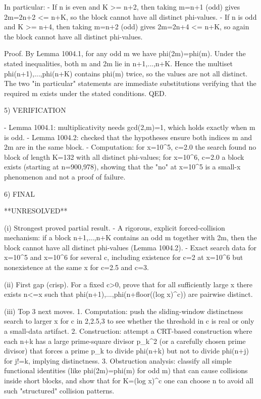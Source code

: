 In particular:
- If n is even and K >= n+2, then taking m=n+1 (odd) gives 2m=2n+2 <= n+K, so the block cannot have all distinct phi-values.
- If n is odd and K >= n+4, then taking m=n+2 (odd) gives 2m=2n+4 <= n+K, so again the block cannot have all distinct phi-values.

Proof.
By Lemma 1004.1, for any odd m we have phi(2m)=phi(m).
Under the stated inequalities, both m and 2m lie in {n+1,...,n+K}. Hence the multiset {phi(n+1),...,phi(n+K)} contains phi(m) twice, so the values are not all distinct.
The two "in particular" statements are immediate substitutions verifying that the required m exists under the stated conditions.  QED.

5) VERIFICATION

- Lemma 1004.1: multiplicativity needs gcd(2,m)=1, which holds exactly when m is odd.
- Lemma 1004.2: checked that the hypotheses ensure both indices m and 2m are in the same block.
- Computation: for x=10^5, c=2.0 the search found no block of length K=132 with all distinct phi-values; for x=10^6, c=2.0 a block exists (starting at n=900,978), showing that the "no" at x=10^5 is a small-x phenomenon and not a proof of failure.

6) FINAL

**UNRESOLVED**

(i) Strongest proved partial result.
- A rigorous, explicit forced-collision mechanism: if a block {n+1,...,n+K} contains an odd m together with 2m, then the block cannot have all distinct phi-values (Lemma 1004.2).
- Exact search data for x=10^5 and x=10^6 for several c, including existence for c=2 at x=10^6 but nonexistence at the same x for c=2.5 and c=3.

(ii) First gap (crisp).
For a fixed c>0, prove that for all sufficiently large x there exists n<=x such that phi(n+1),...,phi(n+floor((log x)^c)) are pairwise distinct.

(iii) Top 3 next moves.
1. Computation: push the sliding-window distinctness search to larger x for c in {2,2.5,3} to see whether the threshold in c is real or only a small-data artifact.
2. Construction: attempt a CRT-based construction where each n+k has a large prime-square divisor p_k^2 (or a carefully chosen prime divisor) that forces a prime p_k to divide phi(n+k) but not to divide phi(n+j) for j!=k, implying distinctness.
3. Obstruction analysis: classify all simple functional identities (like phi(2m)=phi(m) for odd m) that can cause collisions inside short blocks, and show that for K=(log x)^c one can choose n to avoid all such "structured" collision patterns.

